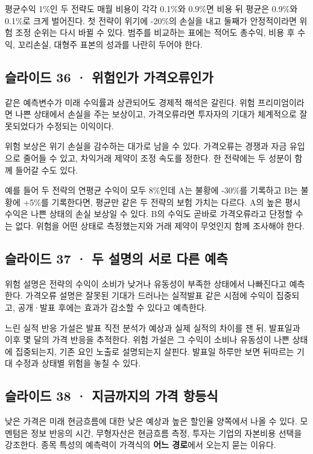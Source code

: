 \documentclass[11pt,a4paper]{article}
\begin{document}
평균수익 1\%인 두 전략도 매월 비용이 각각 0.1\%와 0.9\%면 비용 뒤 평균은 0.9\%와 0.1\%로 크게 벌어진다. 첫 전략이 위기에 -20\%의 손실을 내고 둘째가 안정적이라면 위험 조정 순위는 다시 바뀔 수 있다. 범주를 비교하는 표에는 적어도 총수익, 비용 후 수익, 꼬리손실, 대형주 표본의 성과를 나란히 두어야 한다.\par

\subsection{슬라이드 36 · 위험인가 가격오류인가}
같은 예측변수가 미래 수익률과 상관되어도 경제적 해석은 갈린다. 위험 프리미엄이라면 나쁜 상태에서 손실을 주는 보상이고, 가격오류라면 투자자의 기대가 체계적으로 잘못되었다가 수정되는 이익이다.\par

위험 보상은 위기 손실을 감수하는 대가로 남을 수 있다. 가격오류는 경쟁과 자금 유입으로 줄어들 수 있고, 차익거래 제약이 조정 속도를 정한다. 한 전략에는 두 성분이 함께 들어갈 수도 있다.\par

예를 들어 두 전략의 연평균 수익이 모두 8\%인데 A는 불황에 -30\%를 기록하고 B는 불황에 +5\%를 기록한다면, 평균만 같은 두 전략의 보험 가치는 다르다. A의 높은 평시 수익은 나쁜 상태의 손실 보상일 수 있다. B의 수익도 곧바로 가격오류라고 단정할 수는 없다. 위험을 어떤 상태로 측정했는지와 거래 제약이 무엇인지 함께 조사해야 한다.\par

\subsection{슬라이드 37 · 두 설명의 서로 다른 예측}
위험 설명은 전략의 수익이 소비가 낮거나 유동성이 부족한 상태에서 나빠진다고 예측한다. 가격오류 설명은 잘못된 기대가 드러나는 실적발표 같은 시점에 수익이 집중되고, 공개·발표 후에는 효과가 감소할 수 있다고 예측한다.\par

느린 실적 반응 가설은 발표 직전 분석가 예상과 실제 실적의 차이를 잰 뒤, 발표일과 이후 몇 달의 가격 반응을 추적한다. 위험 가설은 그 수익이 소비나 유동성이 나쁜 상태에 집중되는지, 기존 요인 노출로 설명되는지 살핀다. 발표일 하루만 보면 뒤따르는 기대 수정과 상태별 위험을 놓칠 수 있다.\par

\subsection{슬라이드 38 · 지금까지의 가격 항등식}
낮은 가격은 미래 현금흐름에 대한 낮은 예상과 높은 할인율 양쪽에서 나올 수 있다. 모멘텀은 정보 반응의 시간, 무형자산은 현금흐름 측정, 투자는 기업의 자본비용 선택을 강조한다. 종목 특성의 예측력이 가격식의 \textbf{어느 경로}에서 오는지 묻는 이유다.\par
\end{document}
